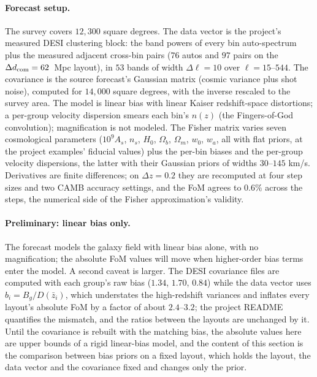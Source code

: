\documentclass[11pt]{article}
\begin{document}
\paragraph{Forecast setup.}
The survey covers $12{,}300$ square degrees.  The data vector is the
project's measured DESI clustering block: the band powers of every
bin auto-spectrum plus the measured adjacent cross-bin pairs ($76$
autos and $97$ pairs on the $\Delta d_{\rm com} = 62$~Mpc layout), in
$53$ bands of width $\Delta \ell = 10$ over $\ell = 15$--$544$.  The
covariance is the source forecast's Gaussian matrix (cosmic variance
plus shot noise), computed for $14{,}000$ square degrees, with the
inverse rescaled to the survey area.  The model is linear bias with
linear Kaiser redshift-space distortions; a per-group velocity
dispersion smears each bin's $n(z)$ (the Fingers-of-God convolution);
magnification is not modeled.  The Fisher matrix varies seven
cosmological parameters ($10^9 A_s$, $n_s$, $H_0$, $\Omega_b$,
$\Omega_m$, $w_0$, $w_a$, all with flat priors, at the project
examples' fiducial values) plus the per-bin biases and the per-group
velocity dispersions, the latter with their Gaussian priors of
widths $30$--$145$ km/s.  Derivatives are finite differences; on
$\Delta z = 0.2$ they are recomputed at four step sizes and two CAMB
accuracy settings, and the FoM agrees to $0.6\%$ across the steps,
the numerical side of the Fisher approximation's validity.

\paragraph{Preliminary: linear bias only.}
The forecast models the galaxy field with linear bias alone, with
no magnification; the absolute FoM values will move when
higher-order bias terms enter the model.  A second caveat is larger.
The DESI covariance files are computed with each group's raw bias
($1.34$, $1.70$, $0.84$) while the data vector uses
$b_i = B_g/D(\bar{z}_i)$, which understates the high-redshift
variances and inflates every layout's absolute FoM by a factor of
about $2.4$--$3.2$; the project README quantifies the mismatch, and
the ratios between the layouts are unchanged by it.  Until the
covariance is rebuilt with the matching bias, the absolute values
here are upper bounds of a rigid linear-bias model, and the content
of this section is the comparison between bias priors on a fixed
layout, which holds the layout, the data vector and the covariance
fixed and changes only the prior.
\end{document}
